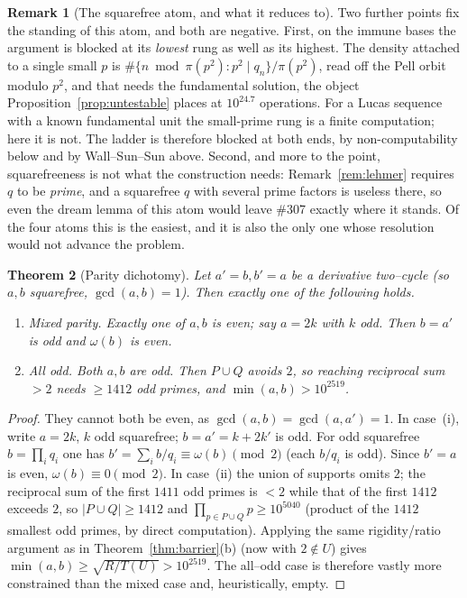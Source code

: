 \documentclass[11pt]{article}
\newtheorem{theorem}{Theorem}[section]
\theoremstyle{definition}
\newtheorem{remark}[theorem]{Remark}
\begin{document}
\begin{remark}[The squarefree atom, and what it reduces to]
Two further points fix the standing of this atom, and both are negative. First, on the immune bases
the argument is blocked at its \emph{lowest} rung as well as its highest. The density attached to a
single small $p$ is $\#\{n\bmod\pi(p^2):p^2\mid q_n\}/\pi(p^2)$, read off the Pell orbit modulo
$p^2$, and that needs the fundamental solution, the object Proposition~\ref{prop:untestable} places
at $10^{24.7}$ operations. For a Lucas sequence with a known fundamental unit the small-prime rung is
a finite computation; here it is not. The ladder is therefore blocked at both ends, by
non-computability below and by Wall--Sun--Sun above. Second, and more to the point, squarefreeness is
not what the construction needs: Remark~\ref{rem:lehmer} requires $q$ to be \emph{prime}, and a
squarefree $q$ with several prime factors is useless there, so even the dream lemma of this atom
would leave \#307 exactly where it stands. Of the four atoms this is the easiest, and it is also the
only one whose resolution would not advance the problem.
\end{remark}

\begin{theorem}[Parity dichotomy]\label{thm:parity}
Let $a'=b,b'=a$ be a derivative two--cycle (so $a,b$ squarefree, $\gcd(a,b)=1$). Then exactly one of
the following holds.
\begin{enumerate}[label=\textup{(\roman*)},leftmargin=2.2em]
\item \emph{Mixed parity.} Exactly one of $a,b$ is even; say $a=2k$ with $k$ odd. Then $b=a'$ is odd
and $\omega(b)$ is even.
\item \emph{All odd.} Both $a,b$ are odd. Then $P\cup Q$ avoids $2$, so reaching reciprocal sum $>2$
needs $\ge 1412$ odd primes, and $\min(a,b)>10^{2519}$.
\end{enumerate}
\end{theorem}

\begin{proof}
They cannot both be even, as $\gcd(a,b)=\gcd(a,a')=1$. In case~(i), write $a=2k$, $k$ odd squarefree;
$b=a'=k+2k'$ is odd. For odd squarefree $b=\prod_{i}q_i$ one has
$b'=\sum_i b/q_i\equiv \omega(b)\pmod 2$ (each $b/q_i$ is odd). Since $b'=a$ is even,
$\omega(b)\equiv0\pmod2$. In case~(ii) the union of supports omits $2$; the reciprocal sum of the
first $1411$ odd primes is $<2$ while that of the first $1412$ exceeds $2$, so $|P\cup Q|\ge 1412$
and $\prod_{p\in P\cup Q}p\ge 10^{5040}$ (product of the $1412$ smallest odd primes, by direct
computation). Applying the same rigidity/ratio argument as in Theorem~\ref{thm:barrier}(b) (now
with $2\notin U$) gives $\min(a,b)\ge\sqrt{R/T(U)}>10^{2519}$. The all--odd case is therefore
vastly more constrained than the mixed case and, heuristically, empty.
\end{proof}
\end{document}
